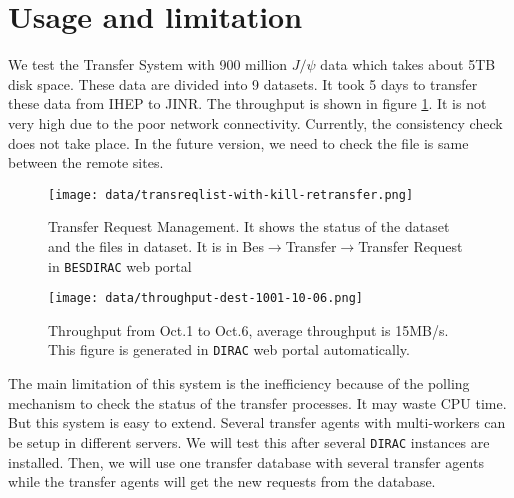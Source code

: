\section{Usage and limitation}
We test the Transfer System with 900 million $J/\psi$ data 
which takes about 5TB disk space. 
These data are divided into 9 datasets.
It took 5 days to transfer 
these data from IHEP to JINR. The throughput is shown in 
figure \ref{fig:throughput}.
It is not very high due to the poor network connectivity.
Currently, the consistency check does not take place.
In the future version, we need to check the file is same between
the remote sites.
\begin{figure}[h]
\begin{minipage}{.49\textwidth}
\texttt{[image: data/transreqlist-with-kill-retransfer.png]}
\caption{\label{fig:ui}Transfer Request Management.
It shows the status of the dataset and the files in dataset.
It is in Bes$\to$Transfer$\to$Transfer Request in {\tt BESDIRAC}
web portal}
\end{minipage}
\hspace{.02\textwidth}
\begin{minipage}{.49\textwidth}
\texttt{[image: data/throughput-dest-1001-10-06.png]}
\caption{\label{fig:throughput}Throughput from Oct.1 to Oct.6, 
average throughput is 15MB/s. This figure is generated in 
{\tt DIRAC} web portal automatically.}
\end{minipage}
\end{figure}

The main limitation of this system is the inefficiency because of 
the polling mechanism to check the status of the transfer processes.
It may waste CPU time. But this system is easy to extend.
Several transfer agents with multi-workers can be setup in different servers.
We will test this after several {\tt DIRAC} instances are installed.
Then, we will use one transfer database with several transfer agents
while the transfer agents will get the new requests from the database.
